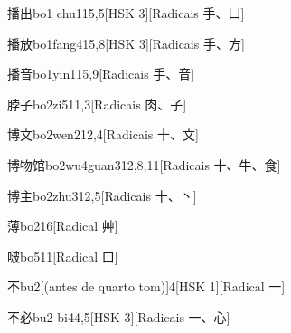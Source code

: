 \begin{entry}{播出}{bo1 chu1}{15,5}[HSK 3][Radicais ⼿、⼐]
\end{entry}

\begin{entry}{播放}{bo1fang4}{15,8}[HSK 3][Radicais ⼿、⽅]
\end{entry}

\begin{entry}{播音}{bo1yin1}{15,9}[Radicais ⼿、⾳]
\end{entry}

\begin{entry}{脖子}{bo2zi5}{11,3}[Radicais ⾁、⼦]
\end{entry}

\begin{entry}{博文}{bo2wen2}{12,4}[Radicais ⼗、⽂]
\end{entry}

\begin{entry}{博物馆}{bo2wu4guan3}{12,8,11}[Radicais ⼗、⽜、⾷]
\end{entry}

\begin{entry}{博主}{bo2zhu3}{12,5}[Radicais ⼗、⼂]
\end{entry}

\begin{entry}{薄}{bo2}{16}[Radical ⾋]
\end{entry}

\begin{entry}{啵}{bo5}{11}[Radical ⼝]
\end{entry}

\begin{entry}{不}{bu2}[(antes de quarto tom)]{4}[HSK 1][Radical ⼀]
\end{entry}

\begin{entry}{不必}{bu2 bi4}{4,5}[HSK 3][Radicais ⼀、⼼]
\end{entry}

